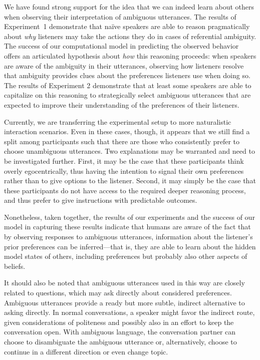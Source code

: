 \documentclass[11pt,a4paper]{article}
\newcommand{\gcs}[1]{\textcolor{blue}{[gcs: #1]}}
\begin{document}
We have found strong support for the idea that we can indeed learn about others when observing their interpretation of ambiguous utterances. 
The results of Experiment~1 demonstrate that na\"ive speakers are able to reason pragmatically about \emph{why} listeners may take the actions they do in cases of referential ambiguity. 
The success of our computational model in predicting the observed behavior offers an articulated hypothesis about \emph{how} this reasoning proceeds: when speakers are aware of the ambiguity in their utterances, observing how listeners resolve that ambiguity provides clues about the preferences listeners use when doing so.
The results of Experiment 2 demonstrate that at least some speakers are able to capitalize on this reasoning to strategically select ambiguous utterances that are expected to improve their understanding of the preferences of their listeners.

 
Currently, we are transferring the experimental setup to more naturalistic interaction scenarios. 
Even in these cases, though, it appears that we still find a split among participants such that there are those who consistently prefer to choose unambiguous utterances. 
Two explanations may be warranted and need to be investigated further. 
First, it may be the case that these participants think overly egocentrically, thus having the intention to signal their own preferences rather than to give options to the listener. 
Second, it may simply be the case that these participants do not have access to the required deeper reasoning process, and thus prefer to give instructions with predictable outcomes. 

Nonetheless, taken together, the results of our experiments and the success of our model in capturing these results indicate that humans are aware of the fact that by observing responses to ambiguous utterances, information about the listener's prior preferences can be inferred---that is, they are able to learn about the hidden model states of others, including preferences but probably also other aspects of beliefs. 


It should also be noted that ambiguous utterances used in this way are closely related to questions, which may ask directly about considered preferences.
Ambiguous utterances provide a ready but more subtle, indirect alternative to asking directly. 
In normal conversations, a speaker might favor the indirect route, given considerations of politeness and possibly also in an effort to keep the conversation open. 
With ambiguous language, the conversation partner can choose to disambiguate the ambiguous utterance or, alternatively, choose to continue in a different direction or even change topic.
\end{document}
